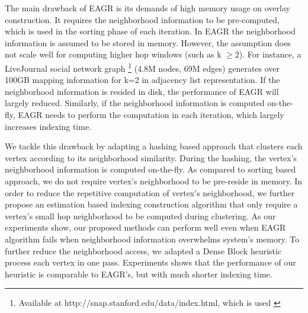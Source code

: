 {The main drawback of EAGR is its demands of high memory usage on overlay construction. It
requires the neighborhood information to be pre-computed, which is used in the sorting phase
of each iteration. In EAGR the neighborhood information is assumed to be stored in memory.
However, the assumption does not scale well for computing higher hop windows (such as k $\geq 2$). 
For instance, a LiveJournal social network graph \footnote{Available at http://snap.stanford.edu/data/index.html, which is used \cite{mondal2014eagr}} (4.8M nodes, 69M edges) generates over 100GB mapping information for k=2 in adjacency list 
representation. If the neighborhood information is resided in disk, the performance of EAGR will
largely reduced. Similarly, if the neighborhood information is computed on-the-fly, EAGR needs
to perform the computation in each iteration, which largely increases indexing time.

We tackle this drawback by adapting a hashing based approach that clusters each vertex according to
 its neighborhood similarity. During the hashing, the vertex's neighborhood information
is computed on-the-fly. As compared to sorting based approach, we do not require vertex's neighborhood
to be pre-reside in memory. In order to reduce the repetitive computation of vertex's neighborhood,
we further propose an estimation based indexing construction algorithm that only require a vertex's small
hop neighborhood to be computed during clustering. As our experiments show, our proposed methods 
can perform well even when EAGR algorithm fails when neighborhood information overwhelms system's memory.
To further reduce the neighborhood access, we adapted a Dense Block heuristic process each vertex
in one pass. Experiments shows that the performance of our heuristic is comparable to EAGR's, but with
much shorter indexing time.
  


  

}
